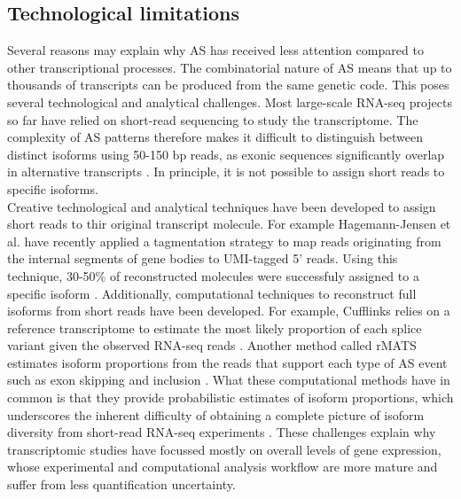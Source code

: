 \subsection{Technological limitations}
Several reasons may explain why AS has received less attention compared to other transcriptional processes. The combinatorial nature of AS means that up to thousands of transcripts can be produced from the same genetic code. This poses several technological and analytical challenges. Most large-scale RNA-seq projects so far have relied on short-read sequencing to study the transcriptome. The complexity of AS patterns therefore makes it difficult to distinguish between distinct isoforms using 50-150 bp reads, as exonic sequences significantly overlap in alternative transcripts \cite{Lacroix2008-wq}. In principle, it is not possible to assign short reads to specific isoforms. \\

Creative technological and analytical techniques have been developed to assign short reads to thir original transcript molecule. For example Hagemann-Jensen et al. have recently applied a tagmentation strategy to map reads originating from the internal segments of gene bodies to UMI-tagged 5' reads. Using this technique, 30-50\% of reconstructed molecules were successfuly assigned to a specific isoform \cite{Hagemann-Jensen2020-ob}. Additionally, computational techniques to reconstruct full isoforms from short reads have been developed. For example, Cufflinks relies on a reference transcriptome to estimate the most likely proportion of each splice variant given the observed RNA-seq reads \cite{Trapnell2012-zh}. Another method called rMATS estimates isoform proportions from the reads that support each type of AS event such as exon skipping and inclusion \cite{Shen2014-bq}. What these computational methods have in common is that they provide probabilistic estimates of isoform proportions, which underscores the inherent difficulty of obtaining a complete picture of isoform diversity from short-read RNA-seq experiments \cite{Shen2014-bq,Katz2010-kl}. These challenges explain why transcriptomic studies have focussed mostly on overall levels of gene expression, whose experimental and computational analysis workflow are more mature and suffer from less quantification uncertainty.

